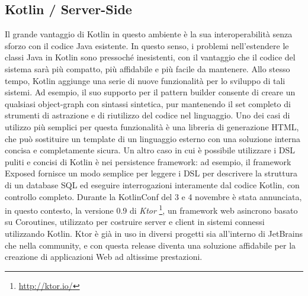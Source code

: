 \subsection{Kotlin / Server-Side}
Il grande vantaggio di Kotlin in questo ambiente è la sua interoperabilità senza sforzo con il codice Java esistente. In questo senso, i problemi nell’estendere le classi Java in Kotlin sono pressoché inesistenti, con il vantaggio che il codice del sistema sarà più compatto, più affidabile e più facile da mantenere. Allo stesso tempo, Kotlin aggiunge una serie di nuove funzionalità per lo sviluppo di tali sistemi. Ad esempio, il suo supporto per il pattern builder consente di creare un qualsiasi object-graph con sintassi sintetica, pur mantenendo il set completo di strumenti di astrazione e di riutilizzo del codice nel linguaggio. Uno dei casi di utilizzo più semplici per questa funzionalità è una libreria di generazione HTML, che può sostituire un template di un linguaggio esterno con una soluzione interna concisa e completamente sicura. Un altro caso in cui è possibile utilizzare i DSL puliti e concisi di Kotlin è nei persistence framework: ad esempio, il framework Exposed fornisce un modo semplice per leggere i DSL per descrivere la struttura di un database SQL ed eseguire interrogazioni interamente dal codice Kotlin, con controllo completo. Durante la KotlinConf del 3 e 4 novembre è stata annunciata, in questo contesto, la versione 0.9 di {\em Ktor} \footnote{\url{http://ktor.io/}}, un framework web asincrono basato su Coroutines, utilizzato per costruire server e client in sistemi connessi utilizzando Kotlin. Ktor è già in uso in diversi progetti sia all'interno di JetBrains che nella community, e con questa release diventa una soluzione affidabile per la creazione di applicazioni Web ad altissime prestazioni.\\

